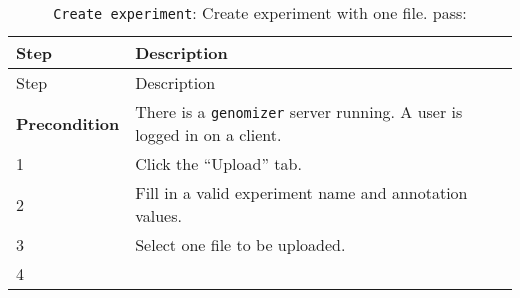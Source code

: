 \begin{longtable}[c]{@{}ll@{}}
\caption{\texttt{Create\ experiment}: Create experiment with one file.
pass:}\tabularnewline
\toprule
\begin{minipage}[b]{0.31\columnwidth}\raggedright\strut
Step
\strut\end{minipage} &
\begin{minipage}[b]{0.63\columnwidth}\raggedright\strut
Description
\strut\end{minipage}\tabularnewline
\midrule
\endfirsthead
\toprule
\begin{minipage}[b]{0.31\columnwidth}\raggedright\strut
Step
\strut\end{minipage} &
\begin{minipage}[b]{0.63\columnwidth}\raggedright\strut
Description
\strut\end{minipage}\tabularnewline
\midrule
\endhead
\begin{minipage}[t]{0.31\columnwidth}\raggedright\strut
\textbf{Precondition}
\strut\end{minipage} &
\begin{minipage}[t]{0.63\columnwidth}\raggedright\strut
There is a \texttt{genomizer} server running. A user is logged in on a
client.
\strut\end{minipage}\tabularnewline
\begin{minipage}[t]{0.31\columnwidth}\raggedright\strut
1
\strut\end{minipage} &
\begin{minipage}[t]{0.63\columnwidth}\raggedright\strut
Click the ``Upload'' tab.
\strut\end{minipage}\tabularnewline
\begin{minipage}[t]{0.31\columnwidth}\raggedright\strut
2
\strut\end{minipage} &
\begin{minipage}[t]{0.63\columnwidth}\raggedright\strut
Fill in a valid experiment name and annotation values.
\strut\end{minipage}\tabularnewline
\begin{minipage}[t]{0.31\columnwidth}\raggedright\strut
3
\strut\end{minipage} &
\begin{minipage}[t]{0.63\columnwidth}\raggedright\strut
Select one file to be uploaded.
\strut\end{minipage}\tabularnewline
\begin{minipage}[t]{0.31\columnwidth}\raggedright\strut
4
\strut\end{minipage} &

\end{longtable}
